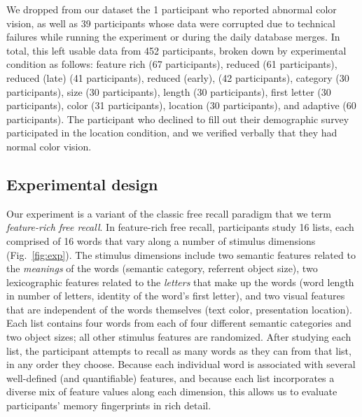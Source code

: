 \documentclass[11pt]{article}
\begin{document}
We dropped from our dataset the 1 participant who reported abnormal color
vision, as well as 39 participants whose data were corrupted due to technical
failures while running the experiment or during the daily database merges. In
total, this left usable data from 452 participants, broken down by experimental
condition as follows: feature rich (67 participants), reduced (61
participants), reduced (late) (41 participants), reduced (early), (42
participants), category (30 participants), size (30 participants), length (30
participants), first letter (30 participants), color (31 participants),
location (30 participants), and adaptive (60 participants). The participant who
declined to fill out their demographic survey participated in the location
condition, and we verified verbally that they had normal color vision.




\subsection*{Experimental design}

Our experiment is a variant of the classic free recall paradigm that we term
\textit{feature-rich free recall}. In feature-rich free recall, participants
study 16 lists, each comprised of 16 words that vary along a number of stimulus
dimensions (Fig.~\ref{fig:exp}). The stimulus dimensions include two semantic
features related to the \textit{meanings} of the words (semantic category,
referrent object size), two lexicographic features related to the
\textit{letters} that make up the words (word length in number of letters,
identity of the word's first letter), and two visual features that are
independent of the words themselves (text color, presentation location). Each
list contains four words from each of four different semantic categories and
two object sizes; all other stimulus features are randomized. After studying
each list, the participant attempts to recall as many words as they can from
that list, in any order they choose. Because each individual word is associated
with several well-defined (and quantifiable) features, and because each list
incorporates a diverse mix of feature values along each dimension, this allows
us to evaluate participants' memory fingerprints in rich detail.
\end{document}
